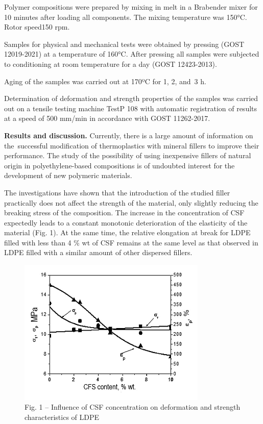 \begin{multicols}{2}
Polymer compositions were prepared by mixing in melt in a Brabender
mixer for 10 minutes after loading all components. The mixing
temperature was 150°C. Rotor speed150 rpm.

Samples for physical and mechanical tests were obtained by pressing
(GOST 12019-2021) at a temperature of 160°C. After pressing all samples
were subjected to conditioning at room temperature for a day (GOST
12423-2013).

Aging of the samples was carried out at 170ºC for 1, 2, and~3 h.

Determination of deformation and strength properties of the samples was
carried out on a tensile testing machine TestP 108 with automatic
registration of results at a speed of 500 mm/min in accordance with GOST
11262-2017.

{\bfseries Results and discussion.} Currently, there is a large amount of
information on the~successful modification of thermoplastics with
mineral fillers to improve their performance. The study of the
possibility of using inexpensive fillers of natural origin in
polyethylene-based compositions is of undoubted interest for the
development of new polymeric materials.

The investigations have shown that the introduction of the studied
filler practically does not affect the strength of the material, only
slightly reducing the breaking stress of the composition. The increase
in the concentration of CSF expectedly leads to a constant monotonic
deterioration of the elasticity of the material (Fig. 1). At the same
time, the relative elongation at break for LDPE filled with less than 4
\% wt of CSF remains at the same level as that observed in LDPE filled
with a similar amount of other dispersed fillers.
\end{multicols}

\begin{figure}[H]
	\centering
	\includegraphics[width=0.8\textwidth]{media/chem/image19}
	\caption*{Fig. 1 -- Influence of CSF concentration on deformation and
strength characteristics of LDPE}
\end{figure}


